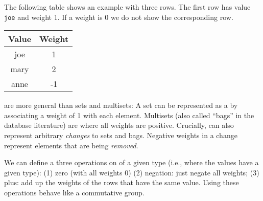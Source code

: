 The following table shows an example \zr with three rows.  The first
row has value \texttt{joe} and weight 1.  If a weight is 0 we do not
show the corresponding row.

\begin{center}
\begin{tabular}{|c|c|}\hline
  Value & Weight \\ \hline
  joe & 1 \\
  mary & 2 \\
  anne & -1 \\ \hline
\end{tabular}
\end{center}


\zrs are more general than sets and multisets: A set can be
represented as a \zr by associating a weight of 1 with each element.
Multisets (also called ``bags'' in the database literature) are \zrs
where all weights are positive.  Crucially, \zrs can also represent
arbitrary \emph{changes} to sets and bags.  Negative weights in a
change represent elements that are being \emph{removed}.

We can define a three operations on \zr of a given type (i.e., where
the values have a given type): (1) zero (with all weights 0) (2)
negation: just negate all weights; (3) plus: add up the weights of the
rows that have the same value.  Using these operations \zrs behave
like a commutative group.


